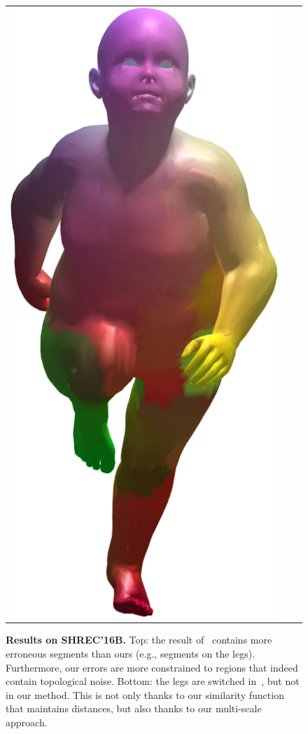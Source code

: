\begin{figure}[h!]
\begin{tabular}{ccc}
		\includegraphics[scale=0.21]{figures/kid23_kid22.png}
	\end{tabular}
	\caption{{\textbf {Results on SHREC'16B.}}
		Top: the result of~\cite{rodola2017partial} contains more erroneous segments than ours (e.g., segments on the legs).
		Furthermore, our errors are more constrained to regions that indeed contain topological noise.
		Bottom: the legs are switched  in~\cite{rodola2017partial}, but not in our method.
		This is not only thanks to our similarity function that maintains distances, but also thanks to our multi-scale approach.
	}
	\label{fig:Shrec16TopImage}
\end{figure}

